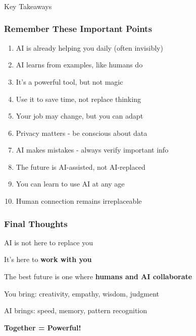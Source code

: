 \begin{frame}[fragile]\frametitle{}
\begin{center}
{\Large Key Takeaways}
\end{center}
\end{frame}

\begin{frame}[fragile]\frametitle{Remember These Important Points}

\begin{enumerate}
\item AI is already helping you daily (often invisibly)
\item AI learns from examples, like humans do
\item It's a powerful tool, but not magic
\item Use it to save time, not replace thinking
\item Your job may change, but you can adapt
\item Privacy matters - be conscious about data
\item AI makes mistakes - always verify important info
\item The future is AI-assisted, not AI-replaced
\item You can learn to use AI at any age
\item Human connection remains irreplaceable
\end{enumerate}

\end{frame}

\begin{frame}[fragile]\frametitle{Final Thoughts}

\begin{center}
\Large

AI is not here to replace you

\vspace{0.5cm}

It's here to {\bf work with you}

\vspace{0.5cm}

The best future is one where {\bf humans and AI collaborate}

\vspace{0.5cm}

You bring: creativity, empathy, wisdom, judgment

AI brings: speed, memory, pattern recognition

\vspace{0.5cm}

{\bf Together = Powerful!}

\end{center}

\end{frame}


